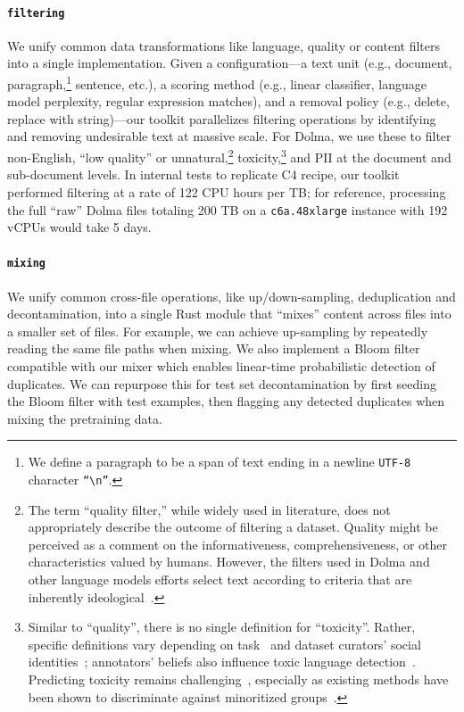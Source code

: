 \documentclass{article}
\newcommand{\dolma}{Dolma\xspace}
\newcommand{\toolkitFilter}{{\color{VarnishNovemberThree}\faFilter}\xspace}
\newcommand{\toolkitDedupe}{{\color{VarnishNovemberThree}\faCopy}\xspace}
\newcommand{\toolkitFilterText}{{\small\toolkitFilter}{\color{VarnishNovemberFour}\texttt{filtering}}\xspace}
\newcommand{\toolkitDedupeText}{{\small\toolkitDedupe\:}{\color{VarnishNovemberFour}\texttt{mixing}}\xspace}
\newcommand{\utf}{\texttt{UTF-8}\xspace}
\begin{document}
\paragraph{\toolkitFilterText} We unify common data transformations like language, quality or content filters into a single implementation. 
Given a configuration---a text unit (e.g., document, paragraph,\footnote{
    We define a paragraph to be a span of text ending in a newline \utf character \texttt{``\textbackslash{}n''}.
} sentence, etc.), a scoring method (e.g., linear classifier, language model perplexity, regular expression matches), and a removal policy (e.g., delete, replace with string)---our toolkit parallelizes filtering operations by identifying and removing undesirable text at massive scale.
For \dolma, we use these to filter non-English, ``low quality'' or unnatural,\footnote{
    The term ``quality filter,'' while widely used in literature, does not appropriately describe the outcome of filtering a dataset. Quality might be perceived as a comment on the informativeness, comprehensiveness, or other characteristics valued by humans. However, the filters used in \dolma and other language models efforts select text according to criteria that are inherently ideological~\citep{gururangan-etal-2022-whose}.
}
toxicity,\footnote{
    Similar to ``quality'', there is no single definition for ``toxicity''.
    Rather, specific definitions vary depending on task~\citep{Vidgen2020-bh} and dataset curators' social identities~\citep{Santy2023-sh};
    annotators' beliefs also influence toxic language detection~\citep{Sap2021-ne}.
    Predicting toxicity remains challenging~\citep{welbl-etal-2021-challenges-detoxifying,markov-2023-holistic-approach-undesired-content-detection}, especially as existing methods have been shown to discriminate against minoritized groups~\citep{xu-etal-2021-detoxifying}.
}
and PII at the document and sub-document levels.
In internal tests to replicate C4 recipe, our toolkit performed filtering at a rate of 122 CPU hours per TB; for reference, processing the full ``raw'' \dolma files totaling 200 TB on a \texttt{c6a.48xlarge} instance with 192 vCPUs would take 5 days.

\paragraph{\toolkitDedupeText} We unify common cross-file operations, like up/down-sampling, deduplication and decontamination, into a single Rust module that ``mixes'' content across files into a smaller set of files.
For example, we can achieve up-sampling by repeatedly reading the same file paths when mixing.
We also implement a Bloom filter~\citep{Bloom1970} compatible with our mixer which enables linear-time probabilistic detection of duplicates.
We can repurpose this for test set decontamination by first seeding the Bloom filter with test examples, then flagging any detected duplicates when mixing the pretraining data.
\end{document}
